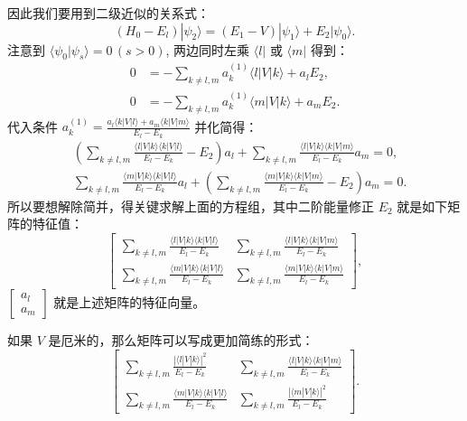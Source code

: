 因此我们要用到二级近似的关系式：
\begin{equation}
	(H_0 - E_l)|\psi_2\rangle = (E_1 - V)|\psi_1\rangle + E_2|\psi_0\rangle.
\end{equation}
注意到 $\langle\psi_0|\psi_s\rangle=0 \,(s>0)$, 两边同时左乘 $\langle l|$ 或 $\langle m|$ 得到：
\begin{align}
	0 &= -\sum_{k \neq l,m} a_k^{(1)}\langle l|V|k\rangle + a_l E_2, \\
	0 &= -\sum_{k \neq l,m} a_k^{(1)}\langle m|V|k\rangle + a_m E_2.
\end{align}
代入条件 $\displaystyle a_k^{(1)} = \frac{a_l\langle k|V|l\rangle + a_m\langle k|V|m\rangle}{E_l - E_k}$ 并化简得：
\begin{align}
	&\left(\sum_{k \neq l,m} \frac{\langle l|V|k\rangle\langle k|V|l\rangle}{E_l - E_k} - E_2\right) a_l + \sum_{k \neq l,m} \frac{\langle l|V|k\rangle\langle k|V|m\rangle}{E_l - E_k} a_m = 0, \\
	&\sum_{k \neq l,m} \frac{\langle m|V|k\rangle\langle k|V|l\rangle}{E_l - E_k} a_l + \left(\sum_{k \neq l,m} \frac{\langle m|V|k\rangle\langle k|V|m\rangle}{E_l - E_k} - E_2\right) a_m = 0.
\end{align}
所以要想解除简并，得关键求解上面的方程组，其中二阶能量修正 $E_2$ 就是如下矩阵的特征值：
\begin{equation}
	\begin{bmatrix}
		\displaystyle\sum_{k \neq l,m} \frac{\langle l|V|k\rangle\langle k|V|l\rangle}{E_l - E_k} & \displaystyle\sum_{k \neq l,m} \frac{\langle l|V|k\rangle\langle k|V|m\rangle}{E_l - E_k} \\[12pt]
		\displaystyle\sum_{k \neq l,m} \frac{\langle m|V|k\rangle\langle k|V|l\rangle}{E_l - E_k} & \displaystyle\sum_{k \neq l,m} \frac{\langle m|V|k\rangle\langle k|V|m\rangle}{E_l - E_k}
	\end{bmatrix},
\end{equation}
$\begin{bmatrix} a_l \\ a_m \end{bmatrix}$ 就是上述矩阵的特征向量。

如果 $V$ 是厄米的，那么矩阵可以写成更加简练的形式：
\begin{equation}
	\begin{bmatrix}
		\displaystyle\sum_{k \neq l,m} \frac{|\langle l|V|k\rangle|^2}{E_l - E_k} & \displaystyle\sum_{k \neq l,m} \frac{\langle l|V|k\rangle\langle k|V|m\rangle}{E_l - E_k} \\[12pt]
		\displaystyle\sum_{k \neq l,m} \frac{\langle m|V|k\rangle\langle k|V|l\rangle}{E_l - E_k} & \displaystyle\sum_{k \neq l,m} \frac{|\langle m|V|k\rangle|^2}{E_l - E_k}
	\end{bmatrix}.
\end{equation}

